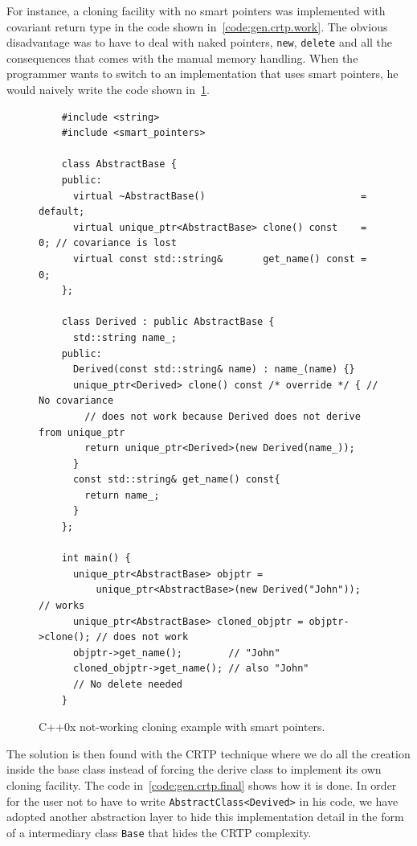 For instance, a cloning facility with no smart pointers was implemented with covariant return type in the code shown
in~\cref{code:gen.crtp.work}. The obvious disadvantage was to have to deal with naked pointers, \texttt{new},
\texttt{delete} and all the consequences that comes with the manual memory handling. When the programmer wants to switch
to an implementation that uses smart pointers, he would naively write the code shown in~\cref{code:gen.crtp.dontwork}.

\begin{figure}[tbh]
  \centering
  \begin{verbatim}
    #include <string>
    #include <smart_pointers>

    class AbstractBase {
    public:
      virtual ~AbstractBase()                           = default;
      virtual unique_ptr<AbstractBase> clone() const    = 0; // covariance is lost
      virtual const std::string&       get_name() const = 0;
    };

    class Derived : public AbstractBase {
      std::string name_;
    public:
      Derived(const std::string& name) : name_(name) {}
      unique_ptr<Derived> clone() const /* override */ { // No covariance
        // does not work because Derived does not derive from unique_ptr
        return unique_ptr<Derived>(new Derived(name_)); 
      }
      const std::string& get_name() const{
        return name_;
      }
    };

    int main() {
      unique_ptr<AbstractBase> objptr =
          unique_ptr<AbstractBase>(new Derived("John"));        // works
      unique_ptr<AbstractBase> cloned_objptr = objptr->clone(); // does not work
      objptr->get_name();        // "John"
      cloned_objptr->get_name(); // also "John"
      // No delete needed
    }
  \end{verbatim}
  \caption{C++0x not-working cloning example with smart pointers.}
  \label{code:gen.crtp.dontwork}
\end{figure}

The solution is then found with the CRTP technique where we do all the creation inside the base class instead of forcing
the derive class to implement its own cloning facility. The code in~\cref{code:gen.crtp.final} shows how it is done. In
order for the user not to have to write \texttt{AbstractClass<Devived>} in his code, we have adopted another abstraction
layer to hide this implementation detail in the form of a intermediary class \texttt{Base} that hides the CRTP
complexity.

